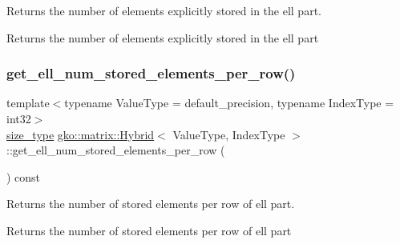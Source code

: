 Returns the number of elements explicitly stored in the ell part. 

\begin{DoxyReturn}{Returns}
the number of elements explicitly stored in the ell part 
\end{DoxyReturn}
\mbox{\label{classgko_1_1matrix_1_1Hybrid_a9ac6d0efc8627c915c73a0155e64548d}} 
\subsubsection{\texorpdfstring{get\+\_\+ell\+\_\+num\+\_\+stored\+\_\+elements\+\_\+per\+\_\+row()}{get\_ell\_num\_stored\_elements\_per\_row()}}
{\footnotesize\ttfamily template$<$typename Value\+Type = default\+\_\+precision, typename Index\+Type = int32$>$ \\
\hyperlink{namespacegko_a6e5c95df0ae4e47aab2f604a22d98ee7}{size\+\_\+type} \hyperlink{classgko_1_1matrix_1_1Hybrid}{gko\+::matrix\+::\+Hybrid}$<$ Value\+Type, Index\+Type $>$\+::get\+\_\+ell\+\_\+num\+\_\+stored\+\_\+elements\+\_\+per\+\_\+row (\begin{DoxyParamCaption}{ }\end{DoxyParamCaption}) const\hspace{0.3cm}{\ttfamily [noexcept]}}



Returns the number of stored elements per row of ell part. 

\begin{DoxyReturn}{Returns}
the number of stored elements per row of ell part 
\end{DoxyReturn}
\mbox{\label{classgko_1_1matrix_1_1Hybrid_a2472495b537b47555a04aa6ba11d5817}} 
